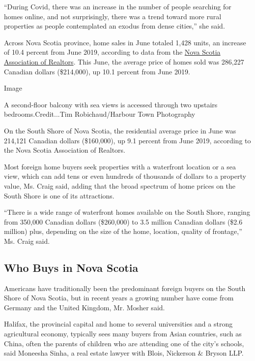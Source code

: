 ``During Covid, there was an increase in the number of people searching
for homes online, and not surprisingly, there was a trend toward more
rural properties as people contemplated an exodus from dense cities,''
she said.

Across Nova Scotia province, home sales in June totaled 1,428 units, an
increase of 10.4 percent from June 2019, according to data from the
\href{https://www.nsrealtors.ca/}{Nova Scotia Association of Realtors}.
This June, the average price of homes sold was 286,227 Canadian dollars
(\$214,000), up 10.1 percent from June 2019.

Image

A second-floor balcony with sea views is accessed through two upstairs
bedrooms.Credit...Tim Robichaud/Harbour Town Photography

On the South Shore of Nova Scotia, the residential average price in June
was 214,121 Canadian dollars (\$160,000), up 9.1 percent from June 2019,
according to the Nova Scotia Association of Realtors.

Most foreign home buyers seek properties with a waterfront location or a
sea view, which can add tens or even hundreds of thousands of dollars to
a property value, Ms. Craig said, adding that the broad spectrum of home
prices on the South Shore is one of its attractions.

``There is a wide range of waterfront homes available on the South
Shore, ranging from 350,000 Canadian dollars (\$260,000) to 3.5 million
Canadian dollars (\$2.6 million) plus, depending on the size of the
home, location, quality of frontage,'' Ms. Craig said.

\hypertarget{who-buys-in-nova-scotia}{%
\subsection{Who Buys in Nova Scotia}\label{who-buys-in-nova-scotia}}

Americans have traditionally been the predominant foreign buyers on the
South Shore of Nova Scotia, but in recent years a growing number have
come from Germany and the United Kingdom, Mr. Mosher said.

Halifax, the provincial capital and home to several universities and a
strong agricultural economy, typically sees many buyers from Asian
countries, such as China, often the parents of children who are
attending one of the city's schools, said Moneesha Sinha, a real estate
lawyer with Blois, Nickerson \& Bryson LLP.

